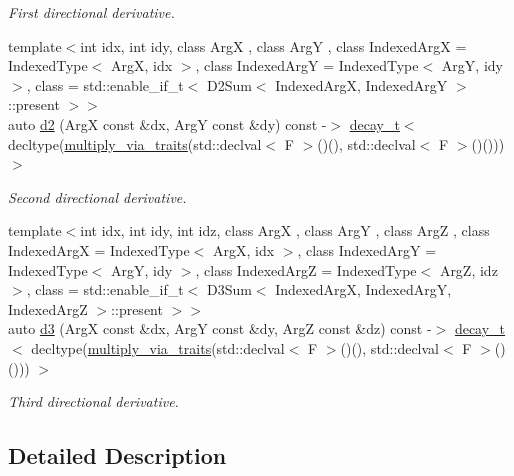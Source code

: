 \begin{DoxyCompactItemize}
\begin{DoxyCompactList}\small\item\em First directional derivative. \end{DoxyCompactList}\item 
{\footnotesize template$<$int idx, int idy, class ArgX , class ArgY , class Indexed\+ArgX  = Indexed\+Type$<$ Arg\+X, idx $>$, class Indexed\+ArgY  = Indexed\+Type$<$ Arg\+Y, idy $>$, class  = std\+::enable\+\_\+if\+\_\+t$<$ D2\+Sum$<$ Indexed\+Arg\+X, Indexed\+Arg\+Y $>$\+::present $>$$>$ }\\auto \hyperlink{structFunG_1_1MathematicalOperations_1_1Squared_a56fbf3854a9c39c7c19f1a65c6f1e126}{d2} (ArgX const \&dx, ArgY const \&dy) const -\/$>$ \hyperlink{namespaceFunG_a7ff91644f18a190ac3d4fc9e970ebe2e}{decay\+\_\+t}$<$ decltype(\hyperlink{namespaceFunG_a839a72c59a888ed89d3efe38897cc376}{multiply\+\_\+via\+\_\+traits}(std\+::declval$<$ F $>$()(), std\+::declval$<$ F $>$()())) $>$
\begin{DoxyCompactList}\small\item\em Second directional derivative. \end{DoxyCompactList}\item 
{\footnotesize template$<$int idx, int idy, int idz, class ArgX , class ArgY , class ArgZ , class Indexed\+ArgX  = Indexed\+Type$<$ Arg\+X, idx $>$, class Indexed\+ArgY  = Indexed\+Type$<$ Arg\+Y, idy $>$, class Indexed\+ArgZ  = Indexed\+Type$<$ Arg\+Z, idz $>$, class  = std\+::enable\+\_\+if\+\_\+t$<$                           D3\+Sum$<$ Indexed\+Arg\+X, Indexed\+Arg\+Y, Indexed\+Arg\+Z $>$\+::present $>$$>$ }\\auto \hyperlink{structFunG_1_1MathematicalOperations_1_1Squared_a012ad3783f0243d2439f24fae70af28e}{d3} (ArgX const \&dx, ArgY const \&dy, ArgZ const \&dz) const -\/$>$ \hyperlink{namespaceFunG_a7ff91644f18a190ac3d4fc9e970ebe2e}{decay\+\_\+t}$<$ decltype(\hyperlink{namespaceFunG_a839a72c59a888ed89d3efe38897cc376}{multiply\+\_\+via\+\_\+traits}(std\+::declval$<$ F $>$()(), std\+::declval$<$ F $>$()())) $>$
\begin{DoxyCompactList}\small\item\em Third directional derivative. \end{DoxyCompactList}\end{DoxyCompactItemize}


\subsection{Detailed Description}
